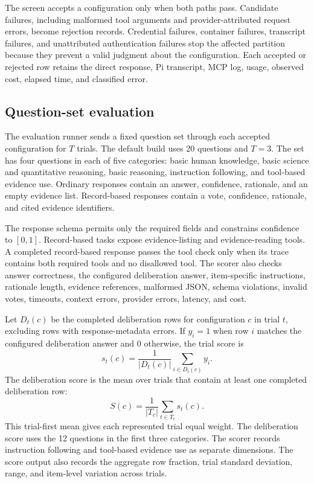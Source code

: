 \documentclass[11pt]{article}
\begin{document}
The screen accepts a configuration only when both paths pass.  Candidate failures, including malformed tool arguments and provider-attributed request errors, become rejection records.  Credential failures, container failures, transcript failures, and unattributed authentication failures stop the affected partition because they prevent a valid judgment about the configuration.  Each accepted or rejected row retains the direct response, Pi transcript, MCP log, usage, observed cost, elapsed time, and classified error.

\subsection{Question-set evaluation}

The evaluation runner sends a fixed question set through each accepted configuration for $T$ trials.  The default build uses 20 questions and $T=3$.  The set has four questions in each of five categories: basic human knowledge, basic science and quantitative reasoning, basic reasoning, instruction following, and tool-based evidence use.  Ordinary responses contain an answer, confidence, rationale, and an empty evidence list.  Record-based responses contain a vote, confidence, rationale, and cited evidence identifiers.

The response schema permits only the required fields and constrains confidence to $[0,1]$.  Record-based tasks expose evidence-listing and evidence-reading tools.  A completed record-based response passes the tool check only when its trace contains both required tools and no disallowed tool.  The scorer also checks answer correctness, the configured deliberation answer, item-specific instructions, rationale length, evidence references, malformed JSON, schema violations, invalid votes, timeouts, context errors, provider errors, latency, and cost.

Let $D_t(c)$ be the completed deliberation rows for configuration $c$ in trial $t$, excluding rows with response-metadata errors.  If $y_i=1$ when row $i$ matches the configured deliberation answer and $0$ otherwise, the trial score is
\[
  s_t(c)=\frac{1}{|D_t(c)|}\sum_{i\in D_t(c)} y_i.
\]
The deliberation score is the mean over trials that contain at least one completed deliberation row:
\[
  S(c)=\frac{1}{|T_c|}\sum_{t\in T_c}s_t(c).
\]
This trial-first mean gives each represented trial equal weight.  The deliberation score uses the 12 questions in the first three categories.  The scorer records instruction following and tool-based evidence use as separate dimensions.  The score output also records the aggregate row fraction, trial standard deviation, range, and item-level variation across trials.
\end{document}
